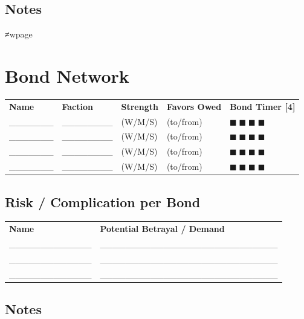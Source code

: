\documentclass[11pt]{article}
\begin{document}
\subsection*{Notes}
\vspace{5cm}
≠wpage

\section*{Bond Network}

\small
\begin{tabularx}{\textwidth}{p{3cm} p{3cm} p{1.5cm} p{1.5cm} X}
\textbf{Name} & \textbf{Faction} & \textbf{Strength} & \textbf{Favors Owed} & \textbf{Bond Timer [4]} \\
_______ & ________ & (W/M/S) & (to/from) & $■$ $■$ $■$ $■$ \\
_______ & ________ & (W/M/S) & (to/from) & $■$ $■$ $■$ $■$ \\
_______ & ________ & (W/M/S) & (to/from) & $■$ $■$ $■$ $■$ \\
_______ & ________ & (W/M/S) & (to/from) & $■$ $■$ $■$ $■$ \\
\end{tabularx}
\normalsize

\subsection*{Risk / Complication per Bond}
\small
\begin{tabularx}{\textwidth}{p{3cm} X}
\textbf{Name} & \textbf{Potential Betrayal / Demand} \\
_____________ & ____________________________ \\
_____________ & ____________________________ \\
_____________ & ____________________________ \\
\end{tabularx}
\normalsize

\subsection*{Notes}
\vspace{6cm}
\end{document}
